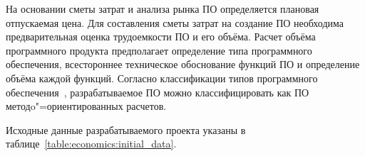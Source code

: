 \def \socialProtectionRate{34}

\def \bgsRate{0.7}

\def \businessTripRate{15}

\def \otherExpenseRate{20}

\def \overheadExpenseRate{100}

\def \profitability{35}

\def \localRepubTaxRate{3.9}

\def \vatRate{20}

\def \profitTaxRate{18}

\def \materialsRate{3}

\def \debugRate{15} %

\def \machineHourCost{2.5}

\def \supportAndAdaptationRate{30}

На основании сметы затрат и анализа рынка ПО определяется плановая отпускаемая цена.
Для составления сметы затрат на создание ПО необходима предварительная оценка трудоемкости ПО и его объёма.
Расчет объёма программного продукта предполагает определение типа программного обеспечения, всестороннее техническое обоснование функций ПО и определение объёма каждой функций.
Согласно классификации типов программного обеспечения~\cite[с.~59,~приложение 1]{palicyn_2006}, разрабатываемое ПО можно классифицировать как ПО методo"=ориентированных расчетов.

Исходные данные разрабатываемого проекта указаны в таблице~\ref{table:economics:initial_data}.

